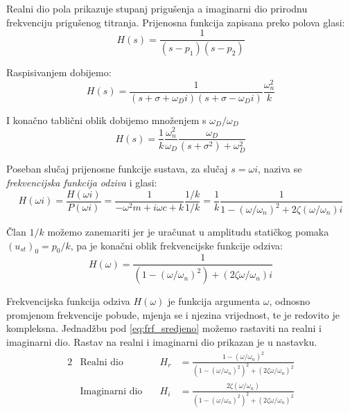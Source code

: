 Realni dio pola prikazuje stupanj prigušenja  a
imaginarni dio prirodnu frekvenciju prigušenog titranja. Prijenosna funkcija
zapisana preko polova glasi:
\begin{equation}
    H(s)=\frac{1}{(s-p_1)(s-p_2)}
\end{equation}

Raspisivanjem dobijemo:
\begin{equation}
    H(s)=\frac{1}{(s+\sigma+\omega_Di)(s+\sigma-\omega_Di)}\frac{\omega_n^2}{k}
\end{equation}

I konačno tablični oblik dobijemo množenjem s $\omega_D/\omega_D$
\begin{equation}
    H(s)=\frac{1}{k}\frac{\omega_n^2}{\omega_D}\frac{\omega_D}{(s+\sigma^2)+\omega_D^2}
\end{equation}

Poseban slučaj prijenosne funkcije sustava, za slučaj $s=\omega i$, naziva se
\textit{frekvencijska funkcija odziva} i glasi:
\begin{equation} \label{eq:frf_nesredjeno}
    H(\omega i) = \frac{H(\omega i)}{P(\omega i)}
                = \frac{1}{-\omega^2 m + i\omega c + k}\frac{1/k}{1/k}
                = \frac{1}{k}\frac{1}{1-(\omega/\omega_n)^2+2\zeta(\omega/\omega_n)i}
\end{equation}

Član $1/k$ možemo zanemariti jer je uračunat u amplitudu statičkog pomaka $(u_{st})_0=p_0/k$,
pa je konačni oblik frekvencijske funkcije odziva:
\begin{equation}\label{eq:frf_sredjeno}
    H(\omega) = \frac{1}{\left(1-(\omega/\omega_n)^2\right)+\left(2\zeta\omega/\omega_n\right)i}
\end{equation}

Frekvencijska funkcija odziva $H(\omega)$ je funkcija argumenta $\omega$, odnosno promjenom
frekvencije pobude, mjenja se i njezina vrijednost, te je redovito je kompleksna.
Jednadžbu pod \eqref{eq:frf_sredjeno} možemo rastaviti na realni i imaginarni dio.
Rastav na realni i imaginarni dio prikazan je u nastavku.
\begin{alignat}{2}
    &\text{Realni dio} & H_r &= \frac{1-(\omega/\omega_n)^2}{(1-(\omega/\omega_n)^2)^2+(2\zeta\omega/\omega_n)^2}
        \label{eq:realni_dio_frf}\\
    &\text{Imaginarni dio}\quad & H_i &=\frac{2\zeta(\omega/\omega_n)}{(1-(\omega/\omega_n)^2)^2+(2\zeta\omega/\omega_n)^2}
        \label{eq:imaginarni_dio_frf}
\end{alignat}

